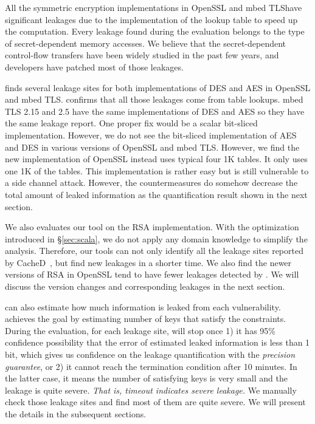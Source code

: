 All the symmetric encryption implementations in OpenSSL and mbed TLS\@ have significant
leakages due to the implementation of the lookup table to speed up the
computation. Every leakage found during the evaluation belongs to the type of
secret-dependent memory accesses. We believe that the secret-dependent
control-flow transfers have been widely studied in the past few years, and
developers have patched most of those leakages. 

\tool{} finds several leakage sites for both implementations of DES and AES in
OpenSSL and mbed TLS\@. \tool{} confirms that all those leakages come from table
lookups. mbed TLS 2.15 and 2.5 have the same implementations of DES and AES so
they have the same leakage report. One proper fix would be a scalar bit-sliced
implementation. However, we do not see the bit-sliced implementation of AES and
DES in various versions of OpenSSL and mbed TLS\@. However, we find the new
implementation of OpenSSL instead uses typical four 1K tables. It only uses one 1K
of the tables. This implementation is rather easy but is still vulnerable to a
side channel attack. However, the countermeasures do somehow decrease the total
amount of leaked information as the quantification result shown in the next
section.

We also evaluates our tool on the RSA implementation. With the optimization
introduced in \S\ref{sec:scala}, we do not apply any domain knowledge to
simplify the analysis. Therefore, our tools can not only identify all the leakage sites
reported by CacheD~\cite{203878}, but find new leakages in a shorter time. 
We also find the newer
versions of RSA in OpenSSL tend to have fewer leakages detected by \tool{}. We
will discuss the version changes and corresponding leakages in the next section.

\tool{} can also estimate how
much information is leaked from each vulnerability. \tool{} achieves the goal by
estimating number of keys that satisfy the constraints. During the evaluation,
for each leakage site, \tool{} will stop once 1) it has 95\% confidence
possibility that the error of estimated leaked information is less than 1 bit,
which gives us confidence on the leakage quantification with the \emph{precision guarantee}, 
or 2) it cannot reach the termination condition after 10 minutes. In
the latter case, it means the number of satisfying keys is very small and the
leakage is quite severe. \emph{That is, timeout indicates severe leakage.}
We manually check those leakage sites and find most of them are quite severe.
We will present the details in the subsequent sections.

